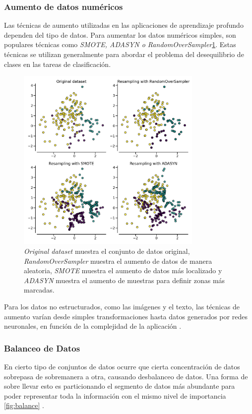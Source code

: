 \documentclass[letter,12pt]{report}
\begin{document}
\subsubsection{Aumento de datos numéricos}
Las técnicas de aumento utilizadas \cite{Augment2} en las aplicaciones de aprendizaje
profundo dependen del tipo de datos. Para aumentar los datos numéricos simples, son
populares técnicas como \textit{SMOTE, ADASYN o RandomOverSampler}\ref{fig:smote}. Estas
técnicas se utilizan generalmente para abordar el problema del desequilibrio de clases en
las tareas de clasificación. 

\begin{figure}[H]
    \centering
    \includegraphics[width=0.8\textwidth]{smote}
    \caption{\textit{Original dataset} muestra el conjunto de datos original,
        \textit{RandomOverSampler} muestra el aumento de datos de manera aleatoria,
        \textit{SMOTE} muestra el aumento de datos más localizado y \textit{ADASYN} muestra el
    aumento de muestras para definir zonas más marcadas.}
    \label{fig:smote}
\end{figure}

Para los datos no estructurados, como las imágenes y el texto, las técnicas de aumento
varían desde simples transformaciones hasta datos generados por redes neuronales, en
función de la complejidad de la aplicación \cite{Augment3}.

\subsubsection{Balanceo de Datos}
En cierto tipo de conjuntos de datos ocurre que cierta concentración de datos sobrepasa
de sobremanera a otra, causando desbalanceo de datos. Una forma de sobre llevar esto es
particionando el segmento de datos más abundante para poder representar toda la
información con el mismo nivel de importancia \ref{fig:balance} \cite{Balan}.
\end{document}
